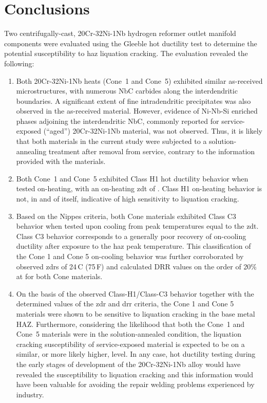 \chapter{Conclusions} \label{ch:conclusions}
Two centrifugally-cast, 20Cr-32Ni-1Nb hydrogen reformer outlet manifold components were evaluated using the Gleeble\texttrademark{} hot ductility test to determine the potential susceptibility to \gls{haz} liquation cracking.  The evaluation revealed the following:

\begin{enumerate}
\item Both 20Cr-32Ni-1Nb heats (Cone~1 and Cone~5) exhibited similar as-received microstructures, with numerous NbC carbides along the interdendritic boundaries. A significant extent of fine intradendritic precipitates was also observed in the as-received material. However, evidence of Ni-Nb-Si enriched phases adjoining the interdendritic NbC, commonly reported for service-exposed (“aged”) 20Cr-32Ni-1Nb material, was not observed. Thus, it is likely that both materials in the current study were subjected to a solution-annealing treatment after removal from service, contrary to the information provided with the materials.
\item Both Cone~1 and Cone~5 exhibited Class H1 hot ductility behavior when tested on-heating, with an on-heating \gls{zdt} of . Class H1 on-heating behavior is not, in and of itself, indicative of high sensitivity to liquation cracking.
\item Based on the Nippes criteria, both Cone materials exhibited Class C3 behavior when tested upon cooling from peak temperatures equal to the \gls{zdt}.  Class C3 behavior corresponds to a generally poor recovery of on-cooling ductility after exposure to the \gls{haz} peak temperature.  This classification of the Cone 1 and Cone 5 on-cooling behavior was further corroborated by observed \gls{zdr}s of 24\,C\textdegree{} (75\,F\textdegree{}) and calculated DRR values on the order of 20\% at  for both Cone materials.
\item On the basis of the observed Class-H1/Class-C3 behavior together with the determined values of the \gls{zdr} and \gls{drr} criteria, the Cone 1 and Cone 5 materials were shown to be sensitive to liquation cracking in the base metal HAZ. Furthermore, considering the likelihood that both the Cone~1 and Cone~5 materials were in the solution-annealed condition, the liquation cracking susceptibility of service-exposed material is expected to be on a similar, or more likely higher, level. In any case, hot ductility testing during the early stages of development of the 20Cr-32Ni-1Nb alloy would have revealed the susceptibility to liquation cracking and this information would have been valuable for avoiding the repair welding problems experienced by industry.

\end{enumerate}
